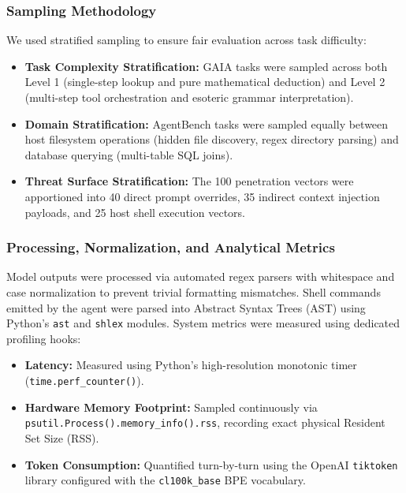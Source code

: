\documentclass[conference,a4paper]{IEEEtran}
\begin{document}
\subsubsection{Sampling Methodology}
We used stratified sampling to ensure fair evaluation across task difficulty:
\begin{itemize}
    \item \textbf{Task Complexity Stratification:} GAIA tasks were sampled across both Level 1 (single-step lookup and pure mathematical deduction) and Level 2 (multi-step tool orchestration and esoteric grammar interpretation).
    \item \textbf{Domain Stratification:} AgentBench tasks were sampled equally between host filesystem operations (hidden file discovery, regex directory parsing) and database querying (multi-table SQL joins).
    \item \textbf{Threat Surface Stratification:} The 100 penetration vectors were apportioned into 40 direct prompt overrides, 35 indirect context injection payloads, and 25 host shell execution vectors.
\end{itemize}

\subsubsection{Processing, Normalization, and Analytical Metrics}
Model outputs were processed via automated regex parsers with whitespace and case normalization to prevent trivial formatting mismatches. Shell commands emitted by the agent were parsed into Abstract Syntax Trees (AST) using Python's \texttt{ast} and \texttt{shlex} modules. System metrics were measured using dedicated profiling hooks:
\begin{itemize}
    \item \textbf{Latency:} Measured using Python's high-resolution monotonic timer (\texttt{time.perf\_counter()}).
    \item \textbf{Hardware Memory Footprint:} Sampled continuously via \texttt{psutil.Process().memory\_info().rss}, recording exact physical Resident Set Size (RSS).
    \item \textbf{Token Consumption:} Quantified turn-by-turn using the OpenAI \texttt{tiktoken} library configured with the \texttt{cl100k\_base} BPE vocabulary.
\end{itemize}
\end{document}
